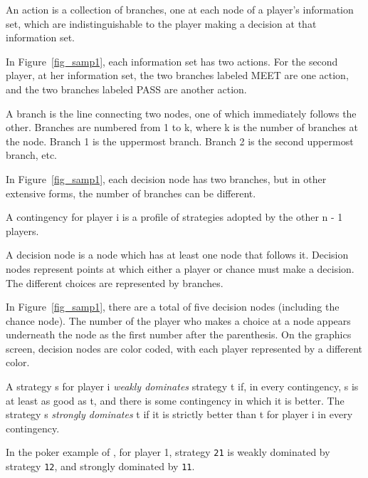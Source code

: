 \begin{helpglossary}
%
\setfooter{\thepage}{}{}{}{}{\thepage}%

\label{actiongloss}
An action is a collection of branches, one at each node of a player's information 
set, which are indistinguishable to the player making a decision at that 
information set. 

In Figure~\ref{fig_samp1}, each information set has two actions.  For the 
second player, at her information set, the two branches labeled MEET are one 
action, and the two branches labeled PASS are another action.
 
\label{branchgloss}
A branch is the line connecting two nodes, one of which immediately 
follows the other.  Branches are numbered from 1 to k, where k is the 
number of branches at the node.  Branch 1 is the uppermost branch.  Branch 
2 is the second uppermost branch, etc. 

In Figure~\ref{fig_samp1}, each decision node has two branches, but in
other extensive forms, the number of branches can be different.

\label{continggloss}
A contingency for player i is a profile of strategies adopted by the other
 n - 1 players.

\label{decnodegloss}
A decision node is a node which has at least one node that follows it.  
Decision nodes represent points at which either a player or chance must 
make a decision.  The different choices are represented by branches.

In Figure~\ref{fig_samp1}, there are a total of five decision nodes (including the chance node). 
 The number of the player who makes a choice at a node appears underneath the
node as the first number after the parenthesis.  On the graphics screen,
decision nodes are color coded, with each player represented by a
different color.

\label{dominationgloss}
A strategy s for player i 
{\em weakly dominates} strategy t if, in every contingency, s 
is at least as good as t, and there is some contingency in which it is 
better.  The strategy s {\em strongly dominates} t if it is 
strictly better than t for player i in every contingency.  

In the poker example of , 
for player 1, strategy \verb+21+ is weakly dominated by strategy \verb+12+, 
and strongly dominated by \verb+11+. 


\end{helpglossary}
